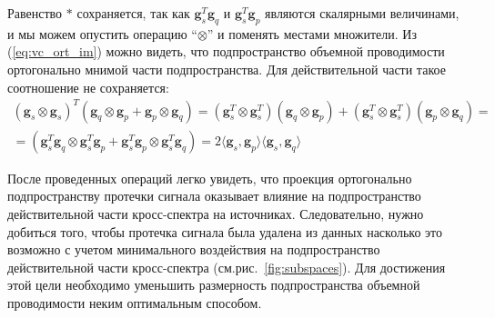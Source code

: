 Равенство $*$ сохраняется, так как $\mathbf{g}^T_s \mathbf{g}_q$ и $\mathbf{g}_s^T \mathbf{g}_p$
являются скалярными величинами, и мы можем опустить операцию ``$\otimes$'' и поменять местами множители.
Из (\ref{eq:vc_ort_im}) можно видеть,
что подпространство объемной проводимости ортогонально мнимой части подпространства.
Для действительной части такое соотношение не сохраняется:
\begin{gather}
    (\mathbf{g}_s \otimes \mathbf{g}_s)^T(\mathbf{g}_q \otimes \mathbf{g}_p + \mathbf{g}_p \otimes \mathbf{g}_q) =
        (\mathbf{g}_s^T \otimes \mathbf{g}_s^T)(\mathbf{g}_q \otimes \mathbf{g}_p) +
        (\mathbf{g}_s^T \otimes \mathbf{g}_s^T)(\mathbf{g}_p \otimes \mathbf{g}_q) = \nonumber \\
       =(\mathbf{g}_s^T \mathbf{g}_q \otimes \mathbf{g}_s^T \mathbf{g}_p +
         \mathbf{g}_s^T \mathbf{g}_p \otimes \mathbf{g}_s^T \mathbf{g}_q) =
        2\langle\mathbf{g}_s, \mathbf{g}_p\rangle \langle\mathbf{g}_s, \mathbf{g}_q\rangle
         \label{eq:vc_ort_re}
\end{gather}

После проведенных операций легко увидеть, что проекция ортогонально подпространству протечки сигнала
оказывает влияние на подпространство действительной части кросс-спектра на источниках.
Следовательно, нужно добиться того, чтобы протечка сигнала была удалена из данных
насколько это возможно с учетом минимального воздействия на подпространство
действительной части кросс-спектра (см.рис.~\ref{fig:subspaces}).
Для достижения этой цели необходимо уменьшить размерность подпространства
объемной проводимости неким оптимальным способом.

